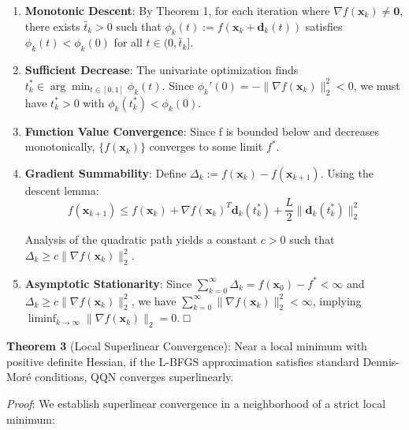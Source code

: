 \begin{enumerate}
\def\labelenumi{\arabic{enumi}.}
\item
  \textbf{Monotonic Descent}: By Theorem 1, for each iteration where \(\nabla f(\mathbf{x}_k) \neq \mathbf{0}\), there
  exists \(\bar{t}_k > 0\) such that \(\phi_k(t) := f(\mathbf{x}_k + \mathbf{d}_k(t))\) satisfies
  \(\phi_k(t) < \phi_k(0)\) for all \(t \in (0, \bar{t}_k]\).
\item
  \textbf{Sufficient Decrease}: The univariate optimization finds \(t_k^* \in \arg\min_{t \in [0,1]} \phi_k(t)\). Since
  \(\phi_k'(0) = -\|\nabla f(\mathbf{x}_k)\|_2^2 < 0\), we must have \(t_k^* > 0\) with \(\phi_k(t_k^*) < \phi_k(0)\).
\item
  \textbf{Function Value Convergence}: Since f is bounded below and decreases monotonically, \(\{f(\mathbf{x}_k)\}\)
  converges to some limit \(f^*\).
\item
  \textbf{Gradient Summability}: Define \(\Delta_k := f(\mathbf{x}_k) - f(\mathbf{x}_{k+1})\). Using the descent lemma:
  \[f(\mathbf{x}_{k+1}) \leq f(\mathbf{x}_k) + \nabla f(\mathbf{x}_k)^T \mathbf{d}_k(t_k^*) + \frac{L}{2}\|\mathbf{d}_k(t_k^*)\|_2^2\]

  Analysis of the quadratic path yields a constant \(c > 0\) such that \(\Delta_k \geq c\|\nabla f(\mathbf{x}_k)\|_2^2\).
\item
  \textbf{Asymptotic Stationarity}: Since \(\sum_{k=0}^{\infty} \Delta_k = f(\mathbf{x}_0) - f^* < \infty\) and
  \(\Delta_k \geq c\|\nabla f(\mathbf{x}_k)\|_2^2\), we have \(\sum_{k=0}^{\infty} \|\nabla f(\mathbf{x}_k)\|_2^2 < \infty\),
  implying \(\liminf_{k \to \infty} \|\nabla f(\mathbf{x}_k)\|_2 = 0\). □
\end{enumerate}

\textbf{Theorem 3} (Local Superlinear Convergence): Near a local minimum with positive definite Hessian, if the L-BFGS
approximation satisfies standard Dennis-Moré conditions, QQN converges superlinearly.

\emph{Proof}: We establish superlinear convergence in a neighborhood of a strict local minimum:

